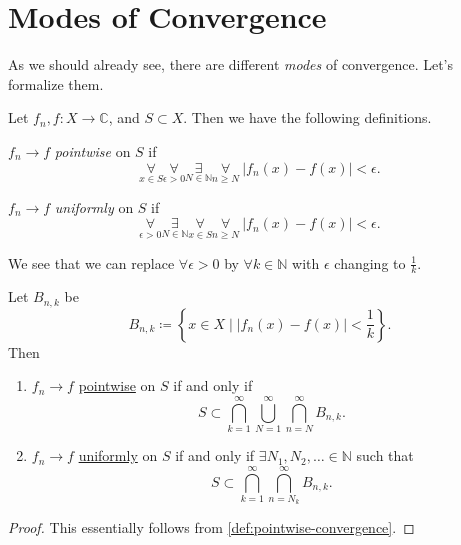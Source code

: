 \section{Modes of Convergence}
As we should already see, there are different \emph{modes} of convergence. Let's formalize them.
\begin{definition*}
	Let \(f_{n}, f\colon X\to \mathbb{C}\), and \(S\subset X\). Then we have the following definitions.
	\begin{definition}\label{def:pointwise-convergence}
		\(f_{n}\to f\) \emph{pointwise} on \(S\) if
		\[
			\underset{x\in S}{\forall}\underset{\epsilon>0}{\forall} \underset{ N\in \mathbb{N}}{\exists}\underset{n\geq  N}{\forall}\ \left\vert f_{n}(x) - f(x) \right\vert < \epsilon.
		\]
	\end{definition}
	\begin{definition}\label{def:uniformly-convergence}
		\(f_{n}\to f\) \emph{uniformly} on \(S\) if
		\[
			\underset{\epsilon >0}{\forall}\underset{N\in\mathbb{N}}{\exists}\underset{x\in S}{\forall}\underset{n\geq N}{\forall}\ \left\vert f_{n}(x) - f(x) \right\vert < \epsilon.
		\]
	\end{definition}
\end{definition*}

\begin{remark}
	We see that we can replace \(\forall \epsilon > 0\) by \(\forall k\in \mathbb{N} \) with \(\epsilon \) changing to \(\frac{1}{k}\).
\end{remark}
\begin{lemma}
	Let \(B_{n, k}\) be
	\[
		B_{n, k}\coloneqq \left\{x\in X \mid \left\vert f_{n}(x) - f(x) \right\vert < \frac{1}{k}\right\}.
	\]
	Then
	\begin{enumerate}[(1)]
		\item \(f_{n}\to f\) \hyperref[def:pointwise-convergence]{pointwise} on \(S\) if and only if
		      \[
			      S\subset \bigcap\limits_{k=1}^{\infty} \bigcup\limits_{N=1}^{\infty} \bigcap\limits_{n=N}^{\infty} B_{n, k}.
		      \]
		\item \(f_{n}\to f\) \hyperref[def:uniformly-convergence]{uniformly} on \(S\) if and only if \(\exists N_1, N_2, \dots \in \mathbb{N}\) such that
		      \[
			      S\subset \bigcap\limits_{k=1}^{\infty} \bigcap\limits_{n=N_{k}}^{\infty} B_{n, k}.
		      \]
	\end{enumerate}
\end{lemma}
\begin{proof}
	This essentially follows from \autoref{def:pointwise-convergence}.
\end{proof}

